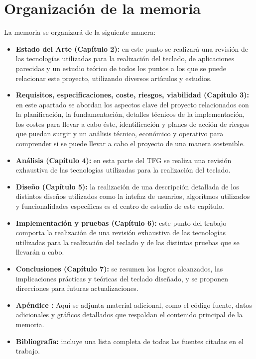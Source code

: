 \section{Organización de la memoria}

La memoria se organizará de la siguiente manera:

\begin{itemize}
	\item \textbf{Estado del Arte (Capítulo 2):} en este punto se realizará una revisión de las tecnologías utilizadas para la realización del teclado, de aplicaciones parecidas y un estudio teórico de todos los puntos a los que se puede relacionar este proyecto, utilizando diversos artículos y estudios.
	\item \textbf{Requisitos, especificaciones, coste, riesgos, viabilidad (Capítulo 3):} en este apartado se abordan los aspectos clave del proyecto relacionados con la planificación,  la fundamentación, detalles técnicos de la implementación, los costes para llevar a cabo éste, identificación y planes de acción de riesgos que puedan surgir y un análisis técnico, económico y operativo para comprender si se puede llevar a cabo el proyecto de una manera sostenible. 
	\item \textbf{Análisis (Capítulo 4):} en esta parte del TFG se realiza una revisión exhaustiva de las tecnologías utilizadas para la realización del teclado. 
	\item \textbf{Diseño (Capítulo 5):} la realización de una descripción detallada de los distintos diseños utilizados como la intefaz de usuarios, algoritmos utilizados y funcionalidades específicas es el centro de estudio de este capítulo.
	\item \textbf{Implementación y pruebas (Capítulo 6):} este punto del trabajo comporta la realización de una revisión exhaustiva de las tecnologías utilizadas para la realización del teclado y de las distintas pruebas que se llevarán a cabo.
	\item \textbf{Conclusiones (Capítulo 7):} se resumen los logros alcanzados, las implicaciones prácticas y teóricas del teclado diseñado, y se proponen direcciones para futuras actualizaciones.
	\item \textbf{Apéndice :} Aquí se adjunta material adicional, como el código fuente, datos adicionales y gráficos detallados que respaldan el contenido principal de la memoria. 
	\item \textbf{Bibliografía:} incluye una lista completa de todas las fuentes citadas en el trabajo.
\end{itemize}
